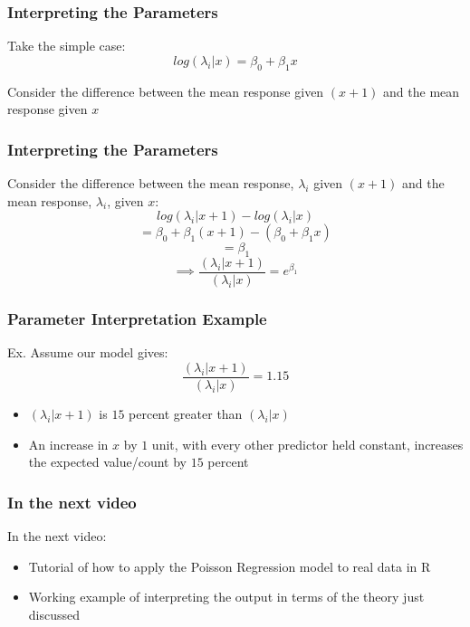 \documentclass{beamer}
\begin{document}
\begin{frame}[fragile]\frametitle{Interpreting the Parameters}	
	
	Take the simple case: $$ log(\lambda_i|x) = \beta_0 + \beta_1 x $$

	Consider the difference between the mean response given $(x+1)$ and the mean response given $x$
	
\end{frame}



\begin{frame}[fragile]\frametitle{Interpreting the Parameters}

	Consider the difference between the mean response, $\lambda_i$ given $(x+1)$ and the mean response, $\lambda_i$, given $x$:
	$$ log(\lambda_i|x+1) - log(\lambda_i|x) $$
	$$ = \beta_0 + \beta_1 (x + 1) - (\beta_0 + \beta_1 x)$$ 
	$$ = \beta_1 $$
	$$ \implies \frac{(\lambda_i|x+1)}{(\lambda_i|x)} = e^{\beta_1} $$

\end{frame}



\begin{frame}[fragile]\frametitle{Parameter Interpretation Example}
	
	Ex. Assume our model gives: $$ \frac{(\lambda_i|x+1)}{(\lambda_i|x)} = 1.15 $$
	
	\begin{itemize}
	
		\item $(\lambda_i|x+1)$ is $15$ percent greater than $(\lambda_i|x)$
		
		\item An increase in $x$ by $1$ unit, with every other predictor held constant, increases the expected value/count by $15$ percent
	
	\end{itemize}
	
\end{frame}



\begin{frame}[fragile]\frametitle{In the next video}
	
	In the next video:	
	
	\begin{itemize}
	
		\item Tutorial of how to apply the Poisson Regression model to real data in R
		
		\item Working example of interpreting the output in terms of the theory just discussed
		
	\end{itemize}
	
\end{frame}
\end{document}
